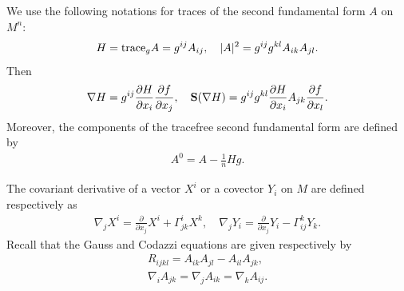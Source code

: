 \documentclass{amsart}
\theoremstyle{definition}
\numberwithin{equation}{section}
\begin{document}
 We use the following notations for traces of the second
fundamental form $A$ on $M^n$:
\begin{align}
H={\rm trace}_g A=g^{ij}A_{ij},\quad |A|^2=g^{ij}g^{kl}A_{ik}A_{jl}.\nonumber
\end{align}
Then
\begin{align}
\nabla H= g^{ij}\frac{\partial
	H}{\partial x_i}\frac{\partial
	f}{\partial x_j}, \quad
{\bf S}(\nabla H)= g^{ij}g^{kl}\frac{\partial
	H}{\partial x_i}A_{jk}\frac{\partial
	f}{\partial x_l}. \nonumber
\end{align}
Moreover, the  components of the tracefree second fundamental form are defined by
\begin{align}
{A^0}=A-\frac{1}{n}Hg.\nonumber
\end{align}

The covariant derivative of a vector $X^i$ or a covector $Y_i$
on $M$ are defined respectively as
\begin{align}
\nabla_j X^i=\frac{\partial}{\partial x_j}X^i+\Gamma^i_{jk}X^k,\quad
\nabla_j Y_i=\frac{\partial}{\partial x_j}Y_i-\Gamma^k_{ij}Y_k.\nonumber
\end{align}
Recall that the Gauss and Codazzi equations are given
respectively by
\begin{align}\label{G}
R_{ijkl}=A_{ik}A_{jl}-A_{il}A_{jk},\\
\nabla_i A_{jk}=\nabla_j A_{ik}=\nabla_k A_{ij}.\label{C}
\end{align}
\end{document}
